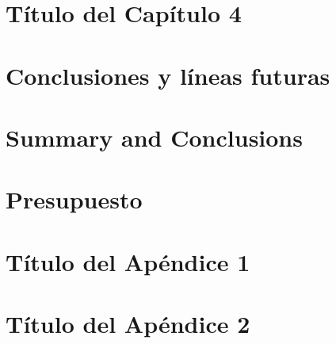 \documentclass[spanish,a4paper,12pt,oneside]{extreport}
\begin{document}


\newpage{\pagestyle{empty}}
\thispagestyle{empty}

\chapter{\LARGE Título del Capítulo 4}
\label{chapter:cuatro}



\newpage{\pagestyle{empty}}
\thispagestyle{empty}

\chapter{\LARGE Conclusiones y líneas futuras}
\label{chapter:Resultados}



\newpage{\pagestyle{empty}}
\thispagestyle{empty}

\chapter{\LARGE Summary and Conclusions}
\label{chapter:Conclusiones}



\newpage{\pagestyle{empty}}
\thispagestyle{empty}

\chapter{\LARGE Presupuesto}
\label{chapter:presupuesto}



\newpage{\pagestyle{empty}\cleardoublepage}
\thispagestyle{empty}

\begin{appendix}

\chapter{\LARGE Título del Apéndice 1}
\label{appendix:1}


\chapter{\LARGE Título del Apéndice 2}
\label{appendix:2}


\end{appendix}

\begin{thebibliography}{X}
\end{thebibliography}
\end{document}
